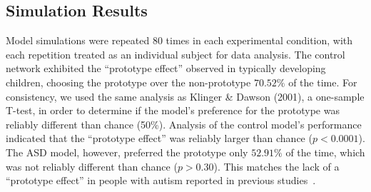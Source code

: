 

\subsection{Simulation Results}
Model simulations were repeated $80$ times in each experimental condition, with each repetition treated as an individual subject for data analysis. The control network exhibited the ``prototype effect'' observed in typically developing children, choosing the prototype over the non-prototype $70.52\%$ of the time.
For consistency, we used the same analysis as Klinger \& Dawson (2001), a one-sample T-test, in order to determine if the model's preference for the prototype was reliably different than chance (50\%). Analysis of the control model's performance indicated that the ``prototype effect'' was reliably larger than chance ($p < 0.0001$). The ASD model, however, preferred the prototype only $52.91\%$ of the time, which was not reliably different than chance ($p > 0.30$). This matches the lack of a ``prototype effect'' in people with autism reported in previous studies~\cite{RefWorks:113,StraussMS:2009:Prototype}.

